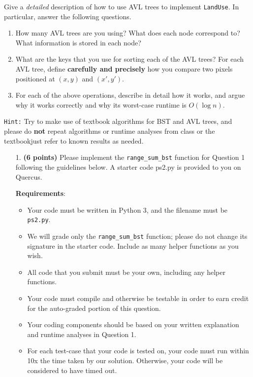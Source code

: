 \documentclass{assignment-263}
\begin{document}
\begin{enumerate}
		Give a \emph{detailed} description of how to use AVL trees to
		implement \texttt{LandUse}. In particular, answer the following
		questions.
		\begin{enumerate}
		\item	How many AVL trees are you using? What does each node
			correspond to? What information is stored in each node?
		\item	What are the keys that you use for sorting each of the AVL
			trees? For each AVL tree, define \textbf{carefully and
			precisely} how you compare two pixels positioned at $(x, y)$ and
			$(x', y')$.
		\item	For each of the above operations, describe in detail how
				it works, and argue why it works correctly and why its
				worst-case runtime is $O(\log n)$.
		\end{enumerate}
		\texttt{Hint:} Try to make use of textbook algorithms for BST and AVL
		trees, and please do \textbf{not} repeat algorithms or runtime
		analyses from class or the textbook\textemdash just refer to known results
		as needed. \hfill \break


\end{enumerate}

\program

\begin{enumerate}
\item[1.] \textbf{(6 points)}
Please implement the \verb|range_sum_bst| function for Question 1 following the guidelines below. 
A starter code ps2.py is provided to you on Quercus. 

\textbf{Requirements}:
\begin{itemize}
\item Your code must be written in Python 3, and the filename must be \verb|ps2.py|.
\item We will grade only the \verb|range_sum_bst| function;
      please do not change its signature in the starter code.
      Include as many helper functions as you wish.
\item All code that you submit must be your own, including any helper functions.
\item Your code must compile and otherwise be testable in order to earn credit
      for the auto-graded portion of this question.
\item Your coding components should be based on your written explanation and runtime analyses in Question 1.
\item For each test-case that your code is tested on, your code must run within
10x the time taken by our solution. Otherwise, your code will be considered to have timed out.
\end{itemize}


\end{enumerate}  
\end{document}
